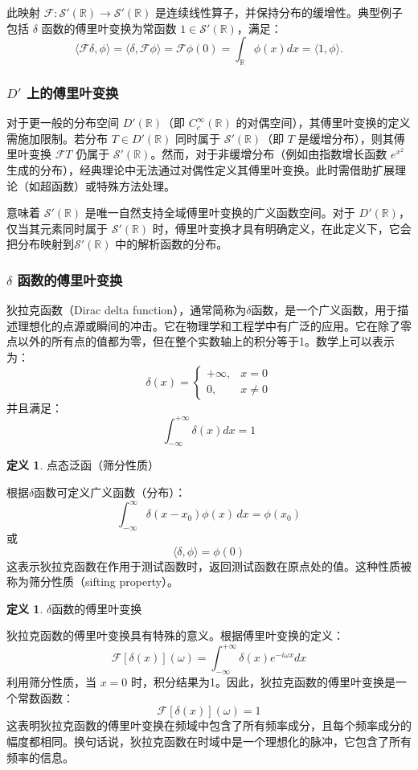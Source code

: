 \documentclass[12pt,a4paper]{article}
\newcommand{\diff}{\mathop{}\!\mathrm{d}}  %
\def\diff{d}%
\theoremstyle{plain}
\theoremstyle{definition}
\newtheorem{definition}[theorem]{定义}
\theoremstyle{remark}
\begin{document}
	
	此映射 $\mathcal{F}: \mathcal{S}'(\mathbb{R}) \to \mathcal{S}'(\mathbb{R})$ 是连续线性算子，并保持分布的缓增性。典型例子包括  $\delta$ 函数的傅里叶变换为常函数 $1 \in \mathcal{S}'(\mathbb{R})$，满足：
	\[
	\langle \mathcal{F}\delta, \phi \rangle = \langle \delta, \mathcal{F}\phi \rangle = \mathcal{F}\phi(0) = \int_{\mathbb{R}} \phi(x) \diff x = \langle 1, \phi \rangle.
	\]


\subsubsection{ $D'$ 上的傅里叶变换}

	对于更一般的分布空间 $D'(\mathbb{R})$（即 $C_c^\infty(\mathbb{R})$ 的对偶空间），其傅里叶变换的定义需施加限制。若分布 $T \in D'(\mathbb{R})$ 同时属于 $\mathcal{S}'(\mathbb{R})$（即 $T$ 是缓增分布），则其傅里叶变换 $\mathcal{F}T$ 仍属于 $\mathcal{S}'(\mathbb{R})$。然而，对于非缓增分布（例如由指数增长函数 $e^{x^2}$ 生成的分布），经典理论中无法通过对偶性定义其傅里叶变换。此时需借助扩展理论（如超函数）或特殊方法处理。

意味着 $\mathcal{S}'(\mathbb{R})$ 是唯一自然支持全域傅里叶变换的广义函数空间。对于 $D'(\mathbb{R})$，仅当其元素同时属于 $\mathcal{S}'(\mathbb{R})$ 时，傅里叶变换才具有明确定义，在此定义下，它会把分布映射到$\mathcal{S}'(\mathbb{R})$ 中的解析函数的分布。

\subsubsection{$\delta$ 函数的傅里叶变换}
狄拉克函数（Dirac delta function），通常简称为$\delta$函数，是一个广义函数，用于描述理想化的点源或瞬间的冲击。它在物理学和工程学中有广泛的应用。它在除了零点以外的所有点的值都为零，但在整个实数轴上的积分等于1。数学上可以表示为：
\[
\delta(x) = \begin{cases} 
	+\infty, & x = 0 \\
	0, & x \ne 0 
\end{cases}
\]
并且满足：
\[
\int_{-\infty}^{+\infty} \delta(x) dx = 1
\]
\begin{definition}点态泛函（筛分性质）
	
	根据$\delta$函数可定义广义函数（分布）：
	\[
	\int_{-\infty}^{\infty} \delta(x - x_0) \phi(x) \, dx = \phi(x_0)
	\]
	或
	\[
	\langle \delta, \phi \rangle = \phi(0)
	\]
	这表示狄拉克函数在作用于测试函数时，返回测试函数在原点处的值。这种性质被称为筛分性质（sifting property）。
\end{definition}

\begin{definition}$\delta$函数的傅里叶变换
	
狄拉克函数的傅里叶变换具有特殊的意义。根据傅里叶变换的定义：
\[
\mathcal{F}[\delta(x)](\omega) = \int_{-\infty}^{+\infty} \delta(x) e^{-i\omega x} dx
\]
利用筛分性质，当 \(x = 0\) 时，积分结果为1。因此，狄拉克函数的傅里叶变换是一个常数函数：
\[
\mathcal{F}[\delta(x)](\omega) = 1
\]
这表明狄拉克函数的傅里叶变换在频域中包含了所有频率成分，且每个频率成分的幅度都相同。换句话说，狄拉克函数在时域中是一个理想化的脉冲，它包含了所有频率的信息。
\end{definition}
\end{document}
